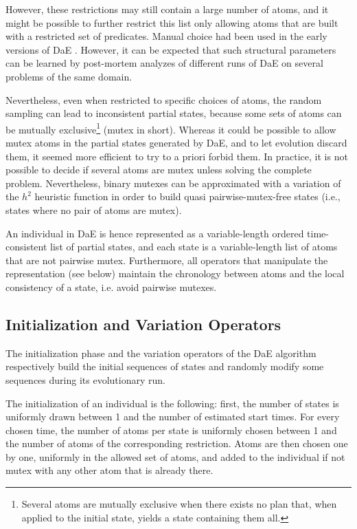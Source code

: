 \documentclass{article}
\begin{document}
However, these restrictions may still contain a large number of atoms, and it might be possible to further restrict this list only allowing atoms that are built with a restricted set of predicates. Manual choice had been used in the early versions of DaE \cite{deterministic:IPC6}. However, it can be expected that such structural parameters can be learned by post-mortem analyzes of different runs of DaE on several problems of the same domain. 

Nevertheless, even when restricted to specific choices of atoms, the random sampling can lead to inconsistent partial states, because some sets of atoms can be mutually exclusive\footnote{Several atoms are mutually exclusive when there exists no plan that, when applied to the initial state, yields a state containing them all.} (mutex in short). Whereas it could be possible to allow mutex atoms in the partial states generated by DaE, and to let evolution discard them, it seemed more efficient to try to a priori forbid them. In practice, it is not possible to decide if several atoms are mutex unless solving the complete problem. Nevertheless, binary mutexes can be approximated with a variation of the $h^2$ heuristic function \cite{HaslumGeffner-AIPS-2000} in order to build quasi pairwise-mutex-free states (i.e., states where no pair of atoms are mutex).

An individual in DaE is hence represented as a variable-length ordered time-consistent list of partial states, and each state is a variable-length list of atoms that are not pairwise mutex. Furthermore, all operators that manipulate the representation (see below) maintain the chronology between atoms and the local consistency of a state, i.e. avoid pairwise mutexes.


\subsection{Initialization and Variation Operators}
\label{section:operators}

The initialization phase and the variation operators of the DaE algorithm respectively build the initial sequences of states and randomly modify some sequences during its evolutionary run.

The initialization of an individual is the following: first, the number of states is uniformly drawn between 1 and the number of estimated start times.  For every chosen time, the number of atoms per state is uniformly chosen between 1 and the number of atoms of the corresponding restriction. Atoms are then chosen one by one, uniformly in the allowed set of atoms, and added to the individual if not mutex with any other atom that is already there.
\end{document}

